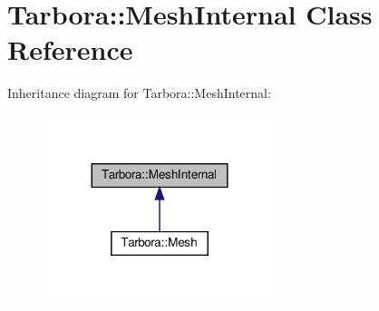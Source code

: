 \hypertarget{classTarbora_1_1MeshInternal}{}\section{Tarbora\+:\+:Mesh\+Internal Class Reference}
\label{classTarbora_1_1MeshInternal}


Inheritance diagram for Tarbora\+:\+:Mesh\+Internal\+:
\nopagebreak
\begin{figure}[H]
\begin{center}
\leavevmode
\includegraphics[width=192pt]{classTarbora_1_1MeshInternal__inherit__graph}
\end{center}
\end{figure}
